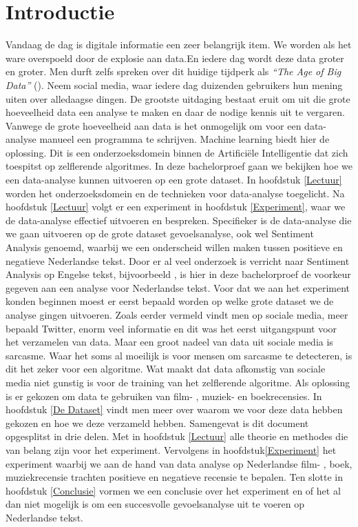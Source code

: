 \chapter{Introductie}\label{introductie}
Vandaag de dag is digitale informatie een zeer belangrijk item. We worden als het ware overspoeld door de explosie aan data.En iedere dag wordt deze data groter en groter. Men durft zelfs spreken over dit huidige tijdperk als \textit{``The Age of Big Data''} (\cite{lohr2012age}). Neem social media, waar iedere dag duizenden gebruikers hun mening uiten over alledaagse dingen. De grootste uitdaging bestaat eruit om uit die grote hoeveelheid data een analyse te maken en daar de nodige kennis uit te vergaren. Vanwege de grote hoeveelheid aan data is het onmogelijk om voor een data-analyse manueel een programma te schrijven. Machine learning biedt hier de oplossing. Dit is een onderzoeksdomein binnen de Artifici\"ele Intelligentie dat zich toespitst op zelflerende algoritmes. In deze bachelorproef gaan we bekijken hoe we een data-analyse kunnen uitvoeren op een grote dataset. In hoofdstuk \ref{Lectuur} worden het onderzoeksdomein en de technieken voor data-analyse toegelicht. Na hoofdstuk \ref{Lectuur} volgt er een experiment in hoofdstuk \ref{Experiment}, waar we de data-analyse effectief uitvoeren en bespreken.
\newline
Specifieker is de data-analyse die we gaan uitvoeren op de grote dataset gevoelsanalyse, ook wel Sentiment Analysis genoemd, waarbij we een onderscheid willen maken tussen positieve en negatieve Nederlandse tekst. Door er al veel onderzoek is verricht naar Sentiment Analysis op Engelse tekst, bijvoorbeeld \cite{pang2008opinion}, is hier in deze bachelorproef de voorkeur gegeven aan een analyse voor Nederlandse tekst.
\newline
Voor dat we aan het experiment konden beginnen moest er eerst bepaald worden op welke grote dataset we de analyse gingen uitvoeren. Zoals eerder vermeld vindt men op sociale media, meer bepaald Twitter, enorm veel informatie en dit was het eerst uitgangspunt voor het verzamelen van data. Maar een groot nadeel van data uit sociale media is sarcasme. Waar het soms al moeilijk is voor mensen om sarcasme te detecteren, is dit het zeker voor een algoritme. Wat maakt dat data afkomstig van sociale media niet gunstig is voor de training van het zelflerende algoritme. Als oplossing is er gekozen om data te gebruiken van film- , muziek- en boekrecensies. In hoofdstuk \ref{De Dataset} vindt men meer over waarom we voor deze data hebben gekozen en hoe we deze verzameld hebben.
\newline
Samengevat is dit document opgesplitst in drie delen. Met in hoofdstuk \ref{Lectuur} alle theorie en methodes die van belang zijn voor het experiment. Vervolgens in hoofdstuk\ref{Experiment} het experiment waarbij we aan de hand van data analyse op Nederlandse film- , boek, muziekrecensie trachten positieve en negatieve recensie te bepalen. Ten slotte in hoofdstuk \ref{Conclusie} vormen we een conclusie over het experiment en of het al dan niet mogelijk is om een succesvolle gevoelsanalyse uit te voeren op Nederlandse tekst.